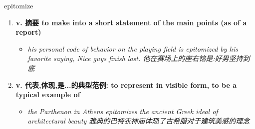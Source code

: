 
\begin{frame}
{\huge epitomize}
\begin{center}
\begin{enumerate}\Large
  \item \textbf{v. 摘要 to make into a short statement of the main points (as of a report)}
  \begin{itemize}
    \item \em{\Large{his personal code of behavior on the playing field is epitomized by his favorite saying, Nice guys finish last. 他在赛场上的座右铭是:好男坚持到底}}
  \end{itemize}
  \item \textbf{v. 代表,体现,是...的典型范例: to represent in visible form, to be a typical example of}
  \begin{itemize}
    \item \em{\Large{the Parthenon in Athens epitomizes the ancient Greek ideal of architectural beauty 雅典的巴特农神庙体现了古希腊对于建筑美感的理念}}
  \end{itemize}
\end{enumerate}
\end{center}
\end{frame}

